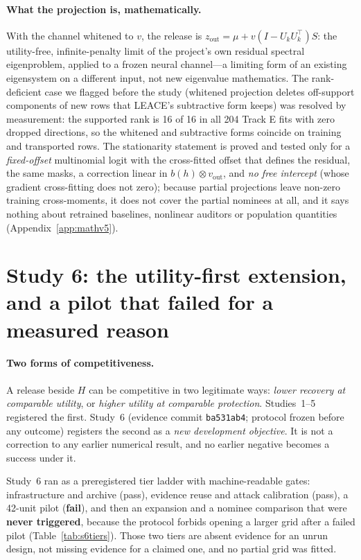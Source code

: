 \documentclass[10pt]{article}
\begin{document}
\paragraph{What the projection is, mathematically.} With the channel whitened to $v$, the release is
$z_{\mathrm{out}}=\mu+v(I-U_kU_k^\top)S$: the utility-free, infinite-penalty limit of the project's own
residual spectral eigenproblem, applied to a frozen neural channel---a limiting form of an existing
eigensystem on a different input, not new eigenvalue mathematics. The rank-deficient case we flagged before
the study (whitened projection deletes off-support components of new rows that LEACE's subtractive form keeps)
was resolved by measurement: the supported rank is 16 of 16 in all 204 Track E fits with zero dropped
directions, so the whitened and subtractive forms coincide on training and transported rows. The
stationarity statement is proved and tested only for a \emph{fixed-offset} multinomial logit with the
cross-fitted offset that defines the residual, the same masks, a correction linear in $b(h)\otimes
v_{\mathrm{out}}$, and \emph{no free intercept} (whose gradient cross-fitting does not zero); because partial projections leave non-zero
training cross-moments, it does not cover the partial nominees at all, and it says nothing about retrained
baselines, nonlinear auditors or population quantities (Appendix~\ref{app:mathv5}).

\section{Study 6: the utility-first extension, and a pilot that failed for a measured reason}
\label{sec:study6}

\paragraph{Two forms of competitiveness.} A release beside $H$ can be competitive in two legitimate ways:
\emph{lower recovery at comparable utility}, or \emph{higher utility at comparable protection}. Studies~1--5
registered the first. Study~6 (evidence commit \texttt{ba531ab4}; protocol frozen before any outcome)
registers the second as a \emph{new development objective}. It is not a correction to any earlier numerical
result, and no earlier negative becomes a success under it.

Study~6 ran as a preregistered tier ladder with machine-readable gates: infrastructure and archive (pass),
evidence reuse and attack calibration (pass), a 42-unit pilot (\textbf{fail}), and then an expansion and a
nominee comparison that were \textbf{never triggered}, because the protocol forbids opening a larger grid after
a failed pilot (Table~\ref{tab:s6tiers}). Those two tiers are absent evidence for an unrun design, not missing
evidence for a claimed one, and no partial grid was fitted.
\end{document}
